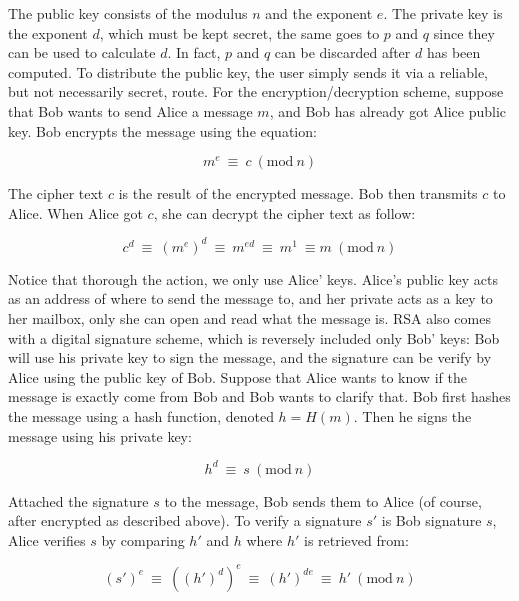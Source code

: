 The public key consists of the modulus $n$ and the exponent $e$. The private key is the exponent $d$, which must be kept secret, the same goes to $p$ and $q$ since they can be used to calculate $d$. In fact, $p$ and $q$ can be discarded after $d$ has been computed. To distribute the public key, the user simply sends it via a reliable, but not necessarily secret, route. For the encryption/decryption scheme, suppose that Bob wants to send Alice a message $m$, and Bob has already got Alice public key. Bob encrypts the message using the equation:

\begin{equation}
  m^e\ \equiv\ c\ (\textrm{mod}\ n)
\end{equation}

The cipher text $c$ is the result of the encrypted message. Bob then transmits $c$ to Alice. When Alice got $c$, she can decrypt the cipher text as follow:

\begin{equation}
  c^d\ \equiv\ (m^e)^d\ \equiv\ m^{ed}\ \equiv\ m^1\ \equiv m\ (\textrm{mod}\ n)
\end{equation}

Notice that thorough the action, we only use Alice' keys. Alice's public key acts as an address of where to send the message to, and her private acts as a key to her mailbox, only she can open and read what the message is. RSA also comes with a digital signature scheme, which is reversely included only Bob' keys: Bob will use his private key to sign the message, and the signature can be verify by Alice using the public key of Bob. Suppose that Alice wants to know if the message is exactly come from Bob and Bob wants to clarify that. Bob first hashes the message using a hash function, denoted $h = H(m)$. Then he signs the message using his private key:

\begin{equation}
  h^d\ \equiv\ s\ (\textrm{mod}\ n)
\end{equation}

Attached the signature $s$ to the message, Bob sends them to Alice (of course, after encrypted as described above). To verify a signature $s'$ is Bob signature $s$, Alice verifies $s$ by comparing $h'$ and $h$ where $h'$ is retrieved from:

\begin{equation}
  (s')^e\ \equiv\ ((h')^d)^e\ \equiv\ (h')^{de}\ \equiv\ h'\ (\textrm{mod}\ n)
\end{equation}

